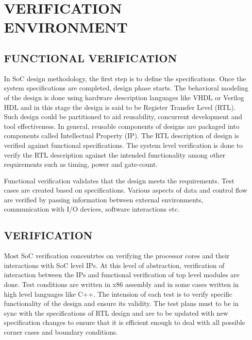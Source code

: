 \chapter{VERIFICATION ENVIRONMENT}
\label{chap:verification.tex}

\section {FUNCTIONAL VERIFICATION}

In SoC design methodology, the first step is to define the specifications. Once the system specifications are completed, design phase starts. The behavioral modeling of the design is done using hardware description languages like VHDL or Verilog HDL and in this stage the design is said to be Register Transfer Level (RTL). Such design could be partitioned to aid reusability, concurrent development and tool effectiveness. In general, reusable components of designs are packaged into components called Intellectual Property (IP). The RTL description of design is verified against functional specifications.  The system level verification is done to verify the RTL description against the intended functionality among other requirements such as timing, power and gate-count. 



Functional verification validates that the design meets the requirements. Test cases are created based on specifications. Various aspects of data and control flow are verified by passing information between external environments, communication with I/O devices,  software interactions etc. 
 
\section {VERIFICATION}

Most SoC verification concentrtes on verifying the processor cores and their interactions with SoC level IPs. At this level of abstraction, verification of interaction between the IPs and functional verification of top level modules are done.  Test conditions are written in x86 assembly and in some cases written in high level languages like C++. The intension of each test is to verify specific functionality of the design and ensure its validity. The test plans must to be in sync with the specifications of RTL design and are to be updated with new specification changes to ensure that it is efficient enough to deal with all possible corner cases and boundary conditions.

